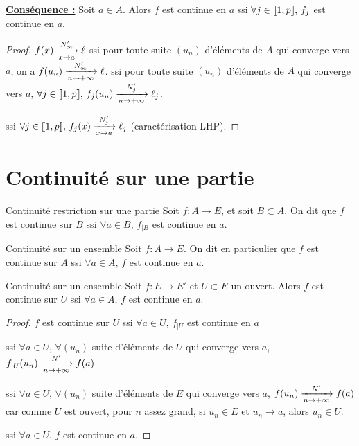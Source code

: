 \textbf{\uline{Conséquence :}}
Soit $a \in A$. Alors $f$ est continue en $a$ ssi $\forall j \in \ninter{1}{p}, \, f_j$ est continue en $a$.


\begin{proof}
    $f(x) \limitnorme{N'_\infty}{x}{a} \ell$ ssi pour toute suite $(u_n)$ 
    d'éléments de $A$ qui converge vers $a$, on a $f(u_n) \limitnorme{N'_\infty}{n}{+ \infty} \ell$.
    ssi pour toute suite $(u_n)$ d'éléments de $A$ qui converge vers $a$, 
    $\forall j \in \ninter{1}{p}, \, f_j(u_n) \limitnorme{N'_j}{n}{+ \infty} \ell_j$.


    ssi $\forall j \in \ninter{1}{p}, \, f_j(x) \limitnorme{N'_j}{x}{a} \ell_j$ (caractérisation LHP).
\end{proof}

\section{Continuité sur une partie}

\begin{definition}{Continuité restriction sur une partie}{}
    Soit $f: A \to E$, et soit $B \subset A$. On dit que $f$ est continue sur $B$ ssi 
    $\forall a \in B, \, f_{|B}$ est continue en $a$.
\end{definition}

\begin{definition}{Continuité sur un ensemble}{}
    Soit $f : A \to E$. On dit en particulier que $f$ est continue sur $A$ ssi
    $\forall a \in A, \, f$ est continue en $a$.
\end{definition}

\begin{proposition}{Continuité sur un ensemble}{}
    Soit $f : E \to E'$ et $U \subset E$ un ouvert.
    Alors $f$ est continue sur $U$ ssi $\forall a \in A$, $f$ est continue en $a$. 
\end{proposition}

\begin{proof}
    $f$ est continue sur $U$ ssi $\forall a \in U, \, f_{|U}$ est continue en $a$ 
    
    ssi $\forall a \in U, \, \forall (u_n)$ suite d'éléments de $U$ qui converge vers $a$,
    $f_{|U}(u_n) \limitnorme{N'}{n}{+ \infty} f(a)$

    ssi $\forall a \in U, \, \forall (u_n)$ suite d'éléments de $E$ qui converge vers $a$,
    $f(u_n) \limitnorme{N'}{n}{+ \infty} f(a)$ car comme $U$ est ouvert, pour $n$ assez
    grand, si $u_n \in E$ et $u_n \to a$, alors $u_n \in U$.

    ssi $\forall a \in U, \, f$ est continue en $a$.
\end{proof}

